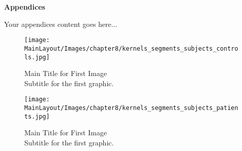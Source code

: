 \par\noindent\textbf{\huge{\color{blue}Appendices}}

\vspace{3cm}

Your appendices content goes here...
\begin{figure}[H]
    \centering
    \texttt{[image: MainLayout/Images/chapter8/kernels\_segments\_subjects\_controls.jpg]}
    \caption{Main Title for First Image \\ \small Subtitle for the first graphic.}
    \label{fig:kernels_segments_subjects_controls}
\end{figure}

\begin{figure}[H]
    \centering
    \texttt{[image: MainLayout/Images/chapter8/kernels\_segments\_subjects\_patients.jpg]}
    \caption{Main Title for First Image \\ \small Subtitle for the first graphic.}
    \label{fig:kernels_segments_subjects_patients}
\end{figure}
\vspace{1cm}

\newpage
\thispagestyle{empty} %
\hspace{1cm} %

\newpage